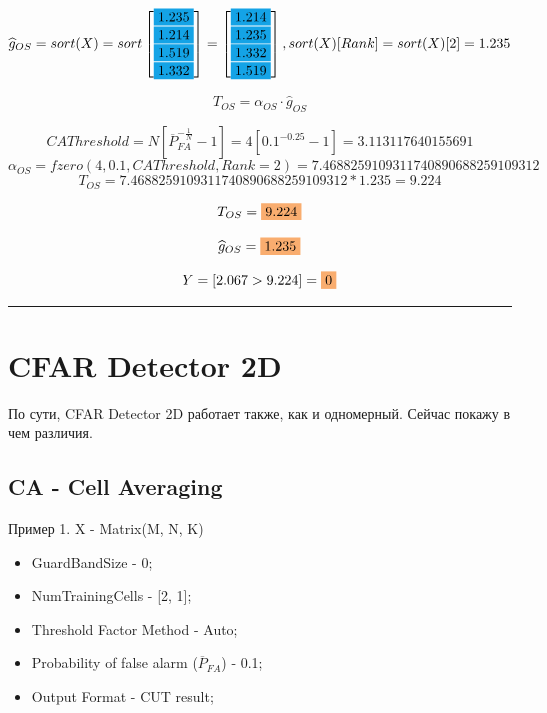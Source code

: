 \documentclass[a4paper,11pt]{article}
\begin{document}
			$$ \widehat{g}_{OS} = sort(X) = 
			sort\begin{bmatrix}
				\colorbox{Cerulean}{1.235}\\
				\colorbox{Cerulean}{1.214}\\
				\colorbox{Cerulean}{1.519}\\
				\colorbox{Cerulean}{1.332}
			\end{bmatrix} = 
			\begin{bmatrix}
				\colorbox{Cerulean}{1.214}\\
				\colorbox{Cerulean}{1.235}\\
				\colorbox{Cerulean}{1.332}\\
				\colorbox{Cerulean}{1.519}
			\end{bmatrix}
			, sort(X)[Rank] = sort(X)[2] = 1.235
			$$
			
			$$ T_{OS} = \alpha_{OS} \cdot \widehat{g}_{OS}$$
		
			$$ CAThreshold = N \left[\overline{P}_{FA}^{-\frac{1}{N}} - 1\right] = 4 \left[0.1^{-0.25} - 1\right] = 3.113117640155691$$
			$$  \alpha_{OS} = fzero(4, 0.1, CAThreshold, Rank=2) = 7.4688259109311740890688259109312 $$
			$$ T_{OS} = 7.4688259109311740890688259109312 * 1.235 = 9.224 $$
			
			\begin{framed}
				
				$$ T_{OS} =  \colorbox{Apricot}{9.224}$$
				
				$$ \widehat{g}_{OS} =  \colorbox{Apricot}{1.235}$$ 
				
				$$ Y = [2.067 > 9.224] = \colorbox{Apricot}{0}$$
			\end{framed}
		
	
			\noindent\rule{\textwidth}{2pt} 
	

	\section{CFAR Detector 2D}	

		По сути, CFAR Detector 2D работает также, как и одномерный. Сейчас покажу в чем различия.
		
		\subsection{CA - Cell Averaging}
		Пример 1. X - Matrix(M, N, K)
		
		\begin{itemize}
			\item GuardBandSize - 0; 
			\item NumTrainingCells - [2, 1];
			\item Threshold Factor Method - Auto;
			\item Probability of false alarm ($\overline{P}_{FA}$) - 0.1;
			\item Output Format - CUT result;
		\end{itemize}
		
\end{document}
